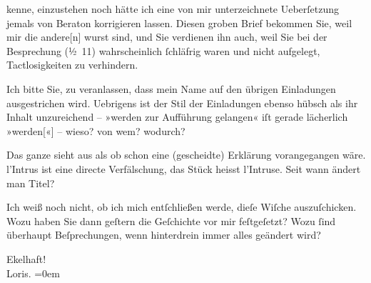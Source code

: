                kenne, einzustehen noch hätte ich eine von mir unterzeichnete Ueberſetzung jemals von
                  Beraton korrigieren lassen. Diesen groben
               Brief bekommen Sie, weil mir die andere{[}n{]} wurst sind, und Sie
               verdienen ihn auch, weil Sie bei der Besprechung (½ 11) wahrscheinlich{ }ſchläfrig waren und nicht aufgelegt, Tactlosigkeiten zu verhindern.\pend
           
\pstart
           Ich bitte Sie, zu veranlassen, dass mein Name auf den übrigen Einladungen
               ausgestrichen wird. Uebrigens ist der Stil der Einladungen ebenso hübsch als ihr
               Inhalt unzureichend – »werden zur Aufführung gelangen« iſt gerade lächerlich
                  »werden{[}«{]} – wieso? von wem? wodurch?\pend
           
\pstart
           Das ganze sieht aus als ob schon eine (gescheidte) Erklärung vorangegangen wäre. l’Intrus ist eine directe Verfälschung, das Stück
               heisst l’Intruse. {\pb}Seit wann ändert man Titel?\pend
           
\pstart
           Ich weiß noch nicht, ob ich mich entſchließen werde, dieſe Wiſche auszuſchicken. Wozu
               haben Sie dann geſtern die Geſchichte vor mir feſtgeſetzt? Wozu{ }ſind überhaupt
               Beſprechungen, wenn hinterdrein immer alles geändert wird?\pend
           
\pstart
           Ekelhaft!{\\[\baselineskip]}\spacefill\mbox{Loris.}\pend
           \leftskip=0em{}\endnumbering{}  \newcommand{\dateiname}{L00092}\newcommand{\titel}{Hugo von Hofmannsthal an Arthur Schnitzler, [4. 4. 1892?]}\newcommand{\editorInnen}{Martin Anton Müller und Gerd-Hermann Susen}
